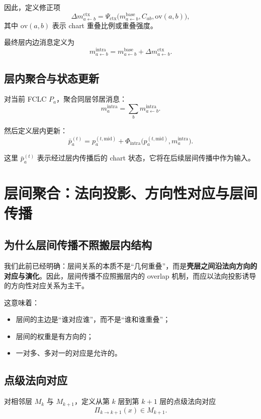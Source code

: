 \documentclass[12pt,a4paper]{ctexart}
\begin{document}
因此，定义修正项
\[
\Delta m_{a\leftarrow b}^{\mathrm{ctx}}
=
\Psi_{\mathrm{ctx}}
\big(
m_{a\leftarrow b}^{\mathrm{base}},
C_{ab},
\mathrm{ov}(a,b)
\big),
\]
其中 \(\mathrm{ov}(a,b)\) 表示 chart 重叠比例或重叠强度。

最终层内边消息定义为
\[
m_{a\leftarrow b}^{\mathrm{intra}}
=
m_{a\leftarrow b}^{\mathrm{base}}
+
\Delta m_{a\leftarrow b}^{\mathrm{ctx}}.
\]

\subsection{层内聚合与状态更新}

对当前 FCLC \(P_a\)，聚合同层邻居消息：
\[
m_a^{\mathrm{intra}}
=
\sum_b m_{a\leftarrow b}^{\mathrm{intra}}.
\]

然后定义层内更新：
\[
\bar p_a^{(t)}
=
p_a^{(t,\mathrm{mid})}
+
\Phi_{\mathrm{intra}}
\big(
p_a^{(t,\mathrm{mid})},
m_a^{\mathrm{intra}}
\big).
\]

这里 \(\bar p_a^{(t)}\) 表示经过层内传播后的 chart 状态，它将在后续层间传播中作为输入。

\section{层间聚合：法向投影、方向性对应与层间传播}

\subsection{为什么层间传播不照搬层内结构}

我们此前已经明确：层间关系的本质不是“几何重叠”，而是\textbf{壳层之间沿法向方向的对应与演化}。因此，层间传播不应照搬层内的 overlap 机制，而应以法向投影诱导的方向性对应关系为主干。

这意味着：
\begin{itemize}[leftmargin=2em]
    \item 层间的主边是“谁对应谁”，而不是“谁和谁重叠”；
    \item 层间的权重是有方向的；
    \item 一对多、多对一的对应是允许的。
\end{itemize}

\subsection{点级法向对应}

对相邻层 \(M_k\) 与 \(M_{k+1}\)，定义从第 \(k\) 层到第 \(k+1\) 层的点级法向对应
\[
\Pi_{k\to k+1}(x)\in M_{k+1}.
\]
\end{document}
